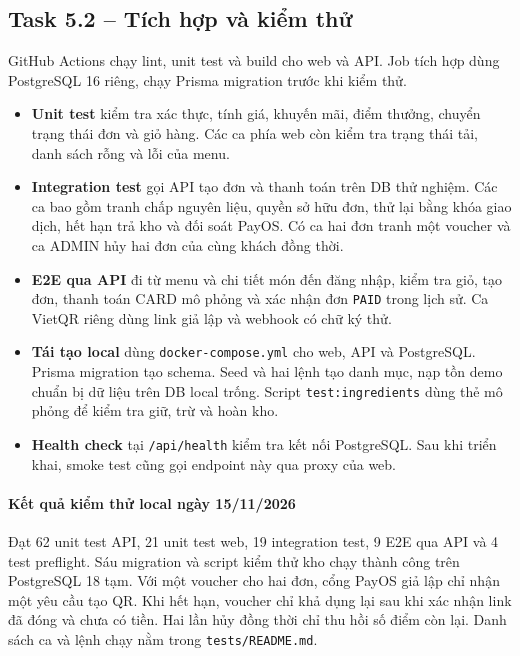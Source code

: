 \subsection{Task 5.2 -- Tích hợp và kiểm thử}

GitHub Actions chạy lint, unit test và build cho web và API. Job tích hợp dùng
PostgreSQL 16 riêng, chạy Prisma migration trước khi kiểm thử.

\begin{itemize}
  \item \textbf{Unit test} kiểm tra xác thực, tính giá, khuyến mãi, điểm thưởng,
        chuyển trạng thái đơn và giỏ hàng. Các ca phía web còn kiểm tra trạng
        thái tải, danh sách rỗng và lỗi của menu.
  \item \textbf{Integration test} gọi API tạo đơn và thanh toán trên DB thử nghiệm.
        Các ca bao gồm tranh chấp nguyên liệu, quyền sở hữu đơn, thử lại bằng
        khóa giao dịch, hết hạn trả kho và đối soát PayOS. Có ca hai đơn tranh
        một voucher và ca ADMIN hủy hai đơn của cùng khách đồng thời.
  \item \textbf{E2E qua API} đi từ menu và chi tiết món đến đăng nhập, kiểm tra
        giỏ, tạo đơn, thanh toán CARD mô phỏng và xác nhận đơn \texttt{PAID}
        trong lịch sử. Ca VietQR riêng dùng link giả lập và webhook có chữ ký thử.
  \item \textbf{Tái tạo local} dùng \nolinkurl{docker-compose.yml} cho web, API và
        PostgreSQL. Prisma migration tạo schema. Seed và hai lệnh tạo danh mục,
        nạp tồn demo chuẩn bị dữ liệu trên DB local trống. Script
        \nolinkurl{test:ingredients} dùng thẻ mô phỏng để kiểm tra giữ, trừ và hoàn kho.
  \item \textbf{Health check} tại \nolinkurl{/api/health} kiểm tra kết nối PostgreSQL.
        Sau khi triển khai, smoke test cũng gọi endpoint này qua proxy của web.
\end{itemize}

\paragraph{Kết quả kiểm thử local ngày 15/11/2026}
Đạt 62 unit test API, 21 unit test web, 19 integration test, 9 E2E qua API
và 4 test preflight. Sáu migration và script kiểm thử kho chạy thành công
trên PostgreSQL 18 tạm. Với một voucher cho hai đơn, cổng PayOS giả lập chỉ
nhận một yêu cầu tạo QR. Khi hết hạn, voucher chỉ khả dụng lại sau khi xác
nhận link đã đóng và chưa có tiền. Hai lần hủy đồng thời chỉ thu hồi số
điểm còn lại. Danh sách ca và lệnh chạy nằm trong \nolinkurl{tests/README.md}.

